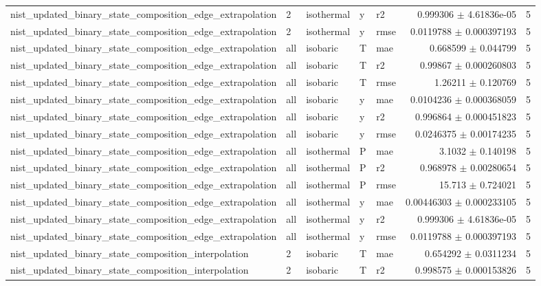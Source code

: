 \begin{tabular}{lllllrr}
nist\_updated\_binary\_state\_composition\_edge\_extrapolation & 2 & isothermal & y & r2 & 0.999306 $\pm$ 4.61836e-05 & 5 \\
nist\_updated\_binary\_state\_composition\_edge\_extrapolation & 2 & isothermal & y & rmse & 0.0119788 $\pm$ 0.000397193 & 5 \\
nist\_updated\_binary\_state\_composition\_edge\_extrapolation & all & isobaric & T & mae & 0.668599 $\pm$ 0.044799 & 5 \\
nist\_updated\_binary\_state\_composition\_edge\_extrapolation & all & isobaric & T & r2 & 0.99867 $\pm$ 0.000260803 & 5 \\
nist\_updated\_binary\_state\_composition\_edge\_extrapolation & all & isobaric & T & rmse & 1.26211 $\pm$ 0.120769 & 5 \\
nist\_updated\_binary\_state\_composition\_edge\_extrapolation & all & isobaric & y & mae & 0.0104236 $\pm$ 0.000368059 & 5 \\
nist\_updated\_binary\_state\_composition\_edge\_extrapolation & all & isobaric & y & r2 & 0.996864 $\pm$ 0.000451823 & 5 \\
nist\_updated\_binary\_state\_composition\_edge\_extrapolation & all & isobaric & y & rmse & 0.0246375 $\pm$ 0.00174235 & 5 \\
nist\_updated\_binary\_state\_composition\_edge\_extrapolation & all & isothermal & P & mae & 3.1032 $\pm$ 0.140198 & 5 \\
nist\_updated\_binary\_state\_composition\_edge\_extrapolation & all & isothermal & P & r2 & 0.968978 $\pm$ 0.00280654 & 5 \\
nist\_updated\_binary\_state\_composition\_edge\_extrapolation & all & isothermal & P & rmse & 15.713 $\pm$ 0.724021 & 5 \\
nist\_updated\_binary\_state\_composition\_edge\_extrapolation & all & isothermal & y & mae & 0.00446303 $\pm$ 0.000233105 & 5 \\
nist\_updated\_binary\_state\_composition\_edge\_extrapolation & all & isothermal & y & r2 & 0.999306 $\pm$ 4.61836e-05 & 5 \\
nist\_updated\_binary\_state\_composition\_edge\_extrapolation & all & isothermal & y & rmse & 0.0119788 $\pm$ 0.000397193 & 5 \\
nist\_updated\_binary\_state\_composition\_interpolation & 2 & isobaric & T & mae & 0.654292 $\pm$ 0.0311234 & 5 \\
nist\_updated\_binary\_state\_composition\_interpolation & 2 & isobaric & T & r2 & 0.998575 $\pm$ 0.000153826 & 5 \\

\end{tabular}
